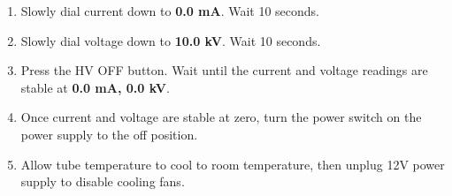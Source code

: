 \begin{enumerate}

\item Slowly dial current down to \textbf{0.0 mA}. Wait 10 seconds.

\item Slowly dial voltage down to \textbf{10.0 kV}. Wait 10 seconds.

\item Press the HV OFF button. Wait until the current and voltage readings are stable at \textbf{0.0 mA, 0.0 kV}.

\item Once current and voltage are stable at zero, turn the power switch on the power supply to the off position.

\item Allow tube temperature to cool to room temperature, then unplug 12V power supply to disable cooling fans.

\end{enumerate}
